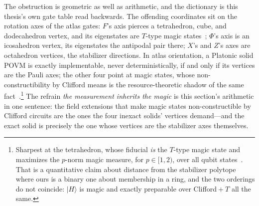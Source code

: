 \documentclass[11pt,a4paper]{article}
\newcommand{\ket}[1]{|#1\rangle}
\begin{document}
The obstruction is geometric as well as arithmetic, and the dictionary is this thesis's own gate table read backwards. The offending coordinates sit on the rotation axes of the atlas gates: $F$'s axis pierces a tetrahedron, cube, and dodecahedron vertex, and its eigenstates are $T$-type magic states~\cite[Def.~1 and Fig.~1]{bravyi2005universalquantumcomputation}; $\Phi$'s axis is an icosahedron vertex, its eigenstates the antipodal pair there; $X$'s and $Z$'s axes are octahedron vertices, the stabilizer directions. In atlas orientation, a Platonic solid POVM is exactly implementable, never deterministically, if and only if its vertices are the Pauli axes; the other four point at magic states, whose non-constructibility by Clifford means is the resource-theoretic shadow of the same fact~\cite[Thm.~1 and \S3.2]{veitch2014resourcetheorystabilizer}.\footnote{Sharpest at the tetrahedron, whose fiducial \textit{is} the $T$-type magic state and maximizes the $p$-norm magic measure, for $p \in [1,2)$, over all qubit states~\cite[p.~1755]{feng2022stabilizerstatessicpovm}. That is a quantitative claim about distance from the stabilizer polytope where ours is a binary one about membership in a ring, and the two orderings do not coincide: $\ket{H}$ is magic and exactly preparable over Clifford${}+T$ all the same.} The refrain \textit{the measurement inherits the magic} is this section's arithmetic in one sentence: the field extensions that make magic states non-constructible by Clifford circuits are the ones the four inexact solids' vertices demand---and the exact solid is precisely the one whose vertices are the stabilizer axes themselves.
\end{document}
